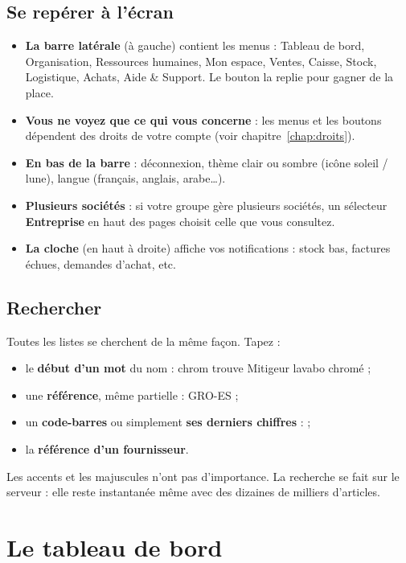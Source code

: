 \documentclass[11pt,a4paper]{report}
\newcommand{\bouton}[1]{\tcbox[on line, colback=sbleu, colupper=white, boxrule=0pt, arc=3pt, left=4pt, right=4pt, top=1pt, bottom=1pt]{\small\sffamily\bfseries #1}}
\newcommand{\champ}[1]{\textsf{\textbf{#1}}}
\begin{document}
\section{Se repérer à l'écran}
\begin{itemize}
  \item \textbf{La barre latérale} (à gauche) contient les menus : Tableau de bord, Organisation, Ressources humaines, Mon espace, Ventes, Caisse, Stock, Logistique, Achats, Aide \& Support. Le bouton \bouton{<} la replie pour gagner de la place.
  \item \textbf{Vous ne voyez que ce qui vous concerne} : les menus et les boutons dépendent des droits de votre compte (voir chapitre~\ref{chap:droits}).
  \item \textbf{En bas de la barre} : déconnexion, thème clair ou sombre (icône soleil / lune), langue (français, anglais, arabe\dots).
  \item \textbf{Plusieurs sociétés} : si votre groupe gère plusieurs sociétés, un sélecteur \champ{Entreprise} en haut des pages choisit celle que vous consultez.
  \item \textbf{La cloche} (en haut à droite) affiche vos notifications : stock bas, factures échues, demandes d'achat, etc.
\end{itemize}

\section{Rechercher}
Toutes les listes se cherchent de la même façon. Tapez :
\begin{itemize}
  \item le \textbf{début d'un mot} du nom : \og chrom \fg{} trouve \og Mitigeur lavabo chromé \fg{} ;
  \item une \textbf{référence}, même partielle : \og GRO-ES \fg{} ;
  \item un \textbf{code-barres} ou simplement \textbf{ses derniers chiffres} :  \fg{} ;
  \item la \textbf{référence d'un fournisseur}.
\end{itemize}
Les accents et les majuscules n'ont pas d'importance. La recherche se fait sur le serveur : elle reste instantanée même avec des dizaines de milliers d'articles.

\chapter{Le tableau de bord}
\end{document}
